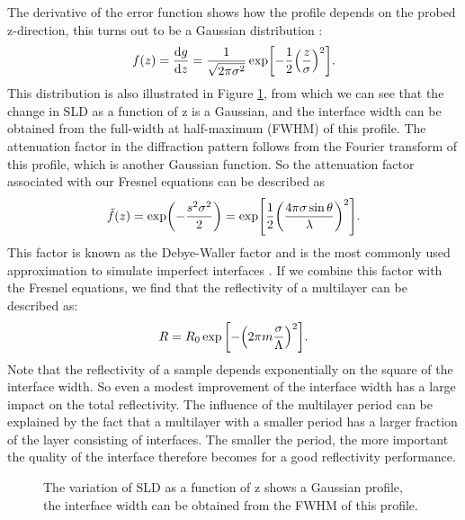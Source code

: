 The derivative of the error function shows how the profile depends on the probed z-direction, this turns out to be a Gaussian distribution \cite{thesis_fredrik}:
\begin{equation}\label{gaussiandistribution}
	f(z) = \frac{\dd g}{\dd z} = \frac{1}{\sqrt{2 \pi \sigma^2}} \exp[-\frac{1}{2} \qty(\frac{z}{\sigma})^2].
\end{equation}
This distribution is also illustrated in Figure \ref{SLD_gaussian}, from which we can see that the change in SLD as a function of z is a Gaussian, and the interface width can be obtained from the full-width at half-maximum (FWHM) of this profile. The attenuation factor in the diffraction pattern follows from the Fourier transform of this profile, which is another Gaussian function. So the attenuation factor associated with our Fresnel equations can be described as
\begin{equation}
	\tilde{f}(z) = \exp(-\frac{s^2 \sigma^2}{2}) = \exp[\frac{1}{2} \qty(\frac{4\pi \sigma \sin \theta}{\lambda})^2].
\end{equation}
This factor is  known as the Debye-Waller factor \cite{debye, waller} and is the most commonly used approximation to simulate imperfect interfaces \cite{debyewaller,debye_waller1,debye_waller2,debye_waller3,debye_waller4}. If we combine this factor with the Fresnel equations, we find that the reflectivity of a multilayer can be described as:
\begin{equation}
	R = R_0 \exp\qty[-\qty(2 \pi m \frac{\sigma}{\Lambda})^2].
\end{equation}
Note that the reflectivity of a sample depends exponentially on the square of the interface width. So even a modest improvement of the interface width has a large impact on the total reflectivity. The influence of the multilayer period can be explained by the fact that a multilayer with a smaller period has a larger fraction of the layer consisting of interfaces. The smaller the period, the more important the quality of the interface therefore becomes for a good reflectivity performance.
\begin{figure}
	\centering
	\def\svgwidth{\textwidth}
	
	\caption{The variation of SLD as a function of z shows a Gaussian profile, the interface width can be obtained from the FWHM of this profile.}
	\label{SLD_gaussian}
\end{figure}
